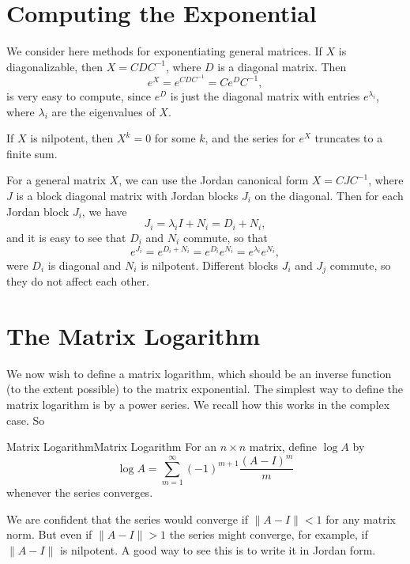 \documentclass[../main.tex]{subfiles}
\begin{document}
\section{Computing the Exponential}
We consider here methods for exponentiating general matrices. If $X$ is diagonalizable, then $X = CDC^{-1}$, where $D$ is a diagonal matrix. Then
\begin{equation}
  e^X = e^{CDC^{-1}} = Ce^DC^{-1},
\end{equation}
is very easy to compute, since $e^D$ is just the diagonal matrix with entries $e^{\lambda_i}$, where $\lambda_i$ are the eigenvalues of $X$.

If $X$ is nilpotent, then $X^k = 0$ for some $k$, and the series for $e^X$ truncates to a finite sum.

For a general matrix $X$, we can use the Jordan canonical form $X = CJC^{-1}$, where $J$ is a block diagonal matrix with Jordan blocks $J_i$ on the diagonal. Then for each Jordan block $J_i$, we have
\begin{equation*}
  J_i = \lambda_i I + N_i = D_i + N_i,
\end{equation*}
and it is easy to see that $D_i$ and $N_i$ commute, so that
\begin{equation}
  e^{J_i} = e^{D_i + N_i} = e^{D_i}e^{N_i} = e^{\lambda_i}e^{N_i},
\end{equation}
were $D_i$ is diagonal and $N_i$ is nilpotent. Different blocks $J_i$ and $J_j$ commute, so they do not affect each other.

\section{The Matrix Logarithm}
We now wish to define a matrix logarithm, which should be an inverse function (to the extent possible) to the matrix exponential. The simplest way to define the matrix logarithm is by a power series. We recall how this works in the complex case. So

\begin{definition}{Matrix Logarithm}{Matrix Logarithm}
  For an $n \times n$ matrix, define $\log A$ by
  \begin{equation}
    \log A = \sum_{m=1}^{\infty } (-1)^{m+1} \frac{(A-I)^m}{m}
  \end{equation}
  whenever the series converges.
\end{definition}

\begin{remark}
  We are confident that the series would converge if $\|A - I\| < 1$ for any matrix norm. But even if $\|A - I\| > 1$ the series might converge, for example, if $\|A - I\|$ is nilpotent. A good way to see this is to write it in Jordan form.
\end{remark}
\end{document}
